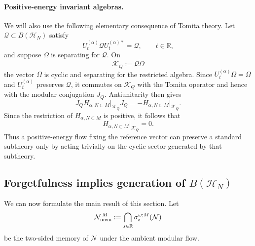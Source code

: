 \documentclass[a4paper,11pt]{article}
\theoremstyle{definition}
\begin{document}
\paragraph{Positive-energy invariant algebras.}
We will also use the following elementary consequence of Tomita theory.
Let $\mathcal Q\subset B(\mathcal H_N)$ satisfy
\begin{equation}
    U_t^{(\alpha)}
    \mathcal Q
    U_t^{(\alpha)*}
    =
    \mathcal Q,
    \qquad
    t\in\mathbb R,
    \label{eq:Q-invariant-Halpha}
\end{equation}
and suppose $\Omega$ is separating for $\mathcal Q$. On
\begin{equation}
    \mathcal K_Q
    :=
    \overline{\mathcal Q\Omega}
\end{equation}
the vector $\Omega$ is cyclic and separating for the restricted algebra.
Since $U_t^{(\alpha)}\Omega=\Omega$ and
$U_t^{(\alpha)}$ preserves $\mathcal Q$, it commutes on
$\mathcal K_Q$ with the Tomita operator and hence with the modular
conjugation $J_Q$. Antiunitarity then gives
\begin{equation}
    J_Q
    H_{\alpha,N\subset M}\big|_{\mathcal K_Q}
    J_Q
    =
    -
    H_{\alpha,N\subset M}\big|_{\mathcal K_Q}.
\end{equation}
Since the restriction of $H_{\alpha,N\subset M}$ is positive, it follows that
\begin{equation}
    \boxed{
    H_{\alpha,N\subset M}\big|_{\mathcal K_Q}=0.
    }
    \label{eq:positive-H-invariant-Q}
\end{equation}
Thus a positive-energy flow fixing the reference vector can preserve a
standard subtheory only by acting trivially on the cyclic sector generated by
that subtheory.

\subsection{Forgetfulness implies generation of $B(\mathcal H_N)$}

We can now formulate the main result of this section. Let
\begin{equation}
    \mathcal N_{\rm mem}^{\,M}
    :=
    \bigcap_{s\in\mathbb R}
    \sigma_s^{\omega;M}(\mathcal N)
    \label{eq:ambient-memory-probing}
\end{equation}
be the two-sided memory of $\mathcal N$ under the ambient modular flow.
\end{document}
